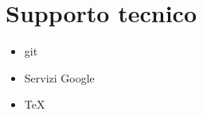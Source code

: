 \documentclass[letterpaper,10pt,italian]{jupyterBook}
\begin{document}
\chapter{Supporto tecnico}
\label{\detokenize{ch/support:supporto-tecnico}}\label{\detokenize{ch/support:programming-hs-support-hs}}\label{\detokenize{ch/support::doc}}\begin{itemize}
\item {} 
\sphinxAtStartPar
git

\item {} 
\sphinxAtStartPar
Servizi Google

\item {} 
\sphinxAtStartPar
TeX

\end{itemize}







\renewcommand{\indexname}{Indice}
\printindex
\end{document}
